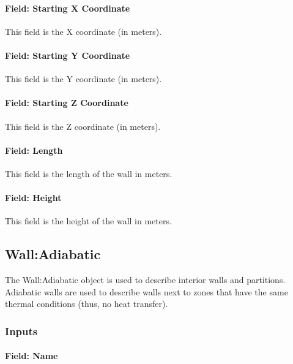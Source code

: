 \paragraph{Field: Starting X Coordinate}\label{field-starting-x-coordinate}

This field is the X coordinate (in meters).

\paragraph{Field: Starting Y Coordinate}\label{field-starting-y-coordinate}

This field is the Y coordinate (in meters).

\paragraph{Field: Starting Z Coordinate}\label{field-starting-z-coordinate}

This field is the Z coordinate (in meters).

\paragraph{Field: Length}\label{field-length-000}

This field is the length of the wall in meters.

\paragraph{Field: Height}\label{field-height-000}

This field is the height of the wall in meters.

\subsection{Wall:Adiabatic}\label{walladiabatic}

The Wall:Adiabatic object is used to describe interior walls and partitions. Adiabatic walls are used to describe walls next to zones that have the same thermal conditions (thus, no heat transfer).

\subsubsection{Inputs}\label{inputs-5-032}

\paragraph{Field: Name}\label{field-name-1-044}

